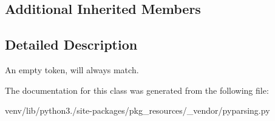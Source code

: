 \subsection*{Additional Inherited Members}


\subsection{Detailed Description}
\begin{DoxyVerb}An empty token, will always match.
\end{DoxyVerb}
 

The documentation for this class was generated from the following file\+:\begin{DoxyCompactItemize}
\item 
venv/lib/python3./site-\/packages/pkg\+\_\+resources/\+\_\+vendor/pyparsing.\+py\end{DoxyCompactItemize}
